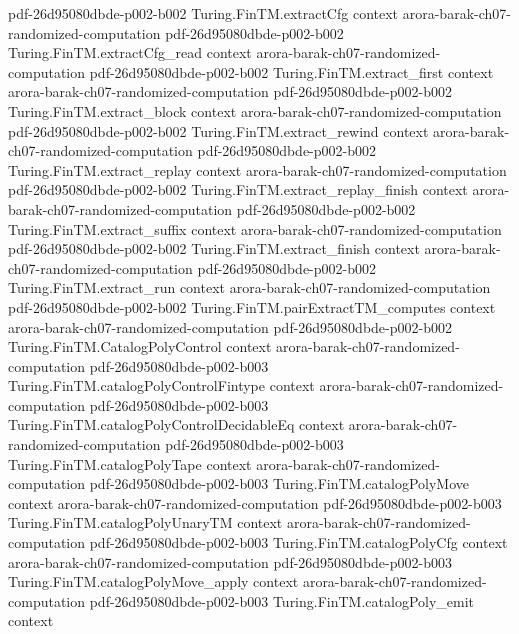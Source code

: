 \begin{theorem}
  {pdf-26d95080dbde-p002-b002}
\proofstep
  {Turing.FinTM.extractCfg}
  {context}
  {arora-barak-ch07-randomized-computation}
  {pdf-26d95080dbde-p002-b002}
\proofstep
  {Turing.FinTM.extractCfg_read}
  {context}
  {arora-barak-ch07-randomized-computation}
  {pdf-26d95080dbde-p002-b002}
\proofstep
  {Turing.FinTM.extract_first}
  {context}
  {arora-barak-ch07-randomized-computation}
  {pdf-26d95080dbde-p002-b002}
\proofstep
  {Turing.FinTM.extract_block}
  {context}
  {arora-barak-ch07-randomized-computation}
  {pdf-26d95080dbde-p002-b002}
\proofstep
  {Turing.FinTM.extract_rewind}
  {context}
  {arora-barak-ch07-randomized-computation}
  {pdf-26d95080dbde-p002-b002}
\proofstep
  {Turing.FinTM.extract_replay}
  {context}
  {arora-barak-ch07-randomized-computation}
  {pdf-26d95080dbde-p002-b002}
\proofstep
  {Turing.FinTM.extract_replay_finish}
  {context}
  {arora-barak-ch07-randomized-computation}
  {pdf-26d95080dbde-p002-b002}
\proofstep
  {Turing.FinTM.extract_suffix}
  {context}
  {arora-barak-ch07-randomized-computation}
  {pdf-26d95080dbde-p002-b002}
\proofstep
  {Turing.FinTM.extract_finish}
  {context}
  {arora-barak-ch07-randomized-computation}
  {pdf-26d95080dbde-p002-b002}
\proofstep
  {Turing.FinTM.extract_run}
  {context}
  {arora-barak-ch07-randomized-computation}
  {pdf-26d95080dbde-p002-b002}
\proofstep
  {Turing.FinTM.pairExtractTM_computes}
  {context}
  {arora-barak-ch07-randomized-computation}
  {pdf-26d95080dbde-p002-b002}
\proofstep
  {Turing.FinTM.CatalogPolyControl}
  {context}
  {arora-barak-ch07-randomized-computation}
  {pdf-26d95080dbde-p002-b003}
\proofstep
  {Turing.FinTM.catalogPolyControlFintype}
  {context}
  {arora-barak-ch07-randomized-computation}
  {pdf-26d95080dbde-p002-b003}
\proofstep
  {Turing.FinTM.catalogPolyControlDecidableEq}
  {context}
  {arora-barak-ch07-randomized-computation}
  {pdf-26d95080dbde-p002-b003}
\proofstep
  {Turing.FinTM.catalogPolyTape}
  {context}
  {arora-barak-ch07-randomized-computation}
  {pdf-26d95080dbde-p002-b003}
\proofstep
  {Turing.FinTM.catalogPolyMove}
  {context}
  {arora-barak-ch07-randomized-computation}
  {pdf-26d95080dbde-p002-b003}
\proofstep
  {Turing.FinTM.catalogPolyUnaryTM}
  {context}
  {arora-barak-ch07-randomized-computation}
  {pdf-26d95080dbde-p002-b003}
\proofstep
  {Turing.FinTM.catalogPolyCfg}
  {context}
  {arora-barak-ch07-randomized-computation}
  {pdf-26d95080dbde-p002-b003}
\proofstep
  {Turing.FinTM.catalogPolyMove_apply}
  {context}
  {arora-barak-ch07-randomized-computation}
  {pdf-26d95080dbde-p002-b003}
\proofstep
  {Turing.FinTM.catalogPoly_emit}
  {context}

\end{theorem}
